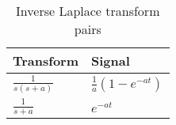 
\begin{table}[htbp]
    \centering
    \def\arraystretch{1.5}
    \begin{tabular}{|p{2.5cm}|p{3cm}|}
        \hline
        \textbf{Transform} & \textbf{Signal} \\
        \hline
        $\frac{1}{s(s+a)}$ & $\frac{1}{a}(1-e^{-at})$ \\
        \hline
        $\frac{1}{s+a}$ & $e^{-at}$ \\
        \hline
    \end{tabular}
    \caption{Inverse Laplace transform pairs}
    \label{laplace-transform-pairs-table}
\end{table}